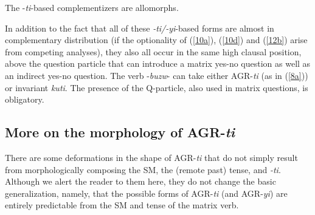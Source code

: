 \documentclass[output=paper,
modfonts
]{langscibook}
\begin{document}
\ea \label{18} \textup{The -\textit{ti}-based complementizers are allomorphs}. \z

In addition to the fact that all of these \textit{-ti/-yi}-based forms are almost in complementary distribution (if the optionality of (\ref{10a}),  (\ref{10d}) and (\ref{12b}) arise from competing analyses), they also all occur in the same high clausal position, above the question particle that can introduce a matrix yes-no question as well as an indirect yes-no question. The verb -\textit{buzw}- can take either AGR-\textit{ti} (as in (\ref{8a})) or invariant \textit{kuti}. The presence of the Q-particle, also used in matrix questions, is obligatory.

\ea
{}



\z\z

\subsection{More on the morphology of AGR-\textit{ti}}

There are some deformations in the shape of AGR-\textit{ti} that do not simply result from morphologically composing the SM, the (remote past) tense, and \textit{-ti}. Although we alert the reader to them here, they do not change the basic generalization, namely, that the possible forms of AGR-\textit{ti} (and AGR-\textit{yi}) are entirely predictable from the SM and tense of the matrix verb. 
\end{document}
